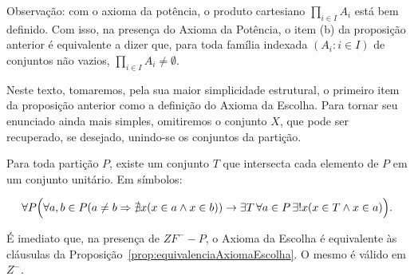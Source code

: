 Observação: com o axioma da potência, o produto cartesiano $\prod_{i\in I} A_i$ está bem definido.
Com isso, na presença do Axioma da Potência, o item (b) da proposição anterior é equivalente a dizer que, para toda família indexada $(A_i: i\in I)$ de conjuntos não vazios, $\prod_{i\in I} A_i \neq \emptyset$.

Neste texto, tomaremos, pela sua maior simplicidade estrutural, o primeiro item da proposição anterior como a definição do Axioma da Escolha.
Para tornar seu enunciado ainda mais simples, omitiremos o conjunto $X$, que pode ser recuperado, se desejado, unindo-se os conjuntos da partição.
\begin{axiom}\label{ax:escolhaParticao}
    Para toda partição $P$, existe um conjunto $T$ que intersecta cada elemento de $P$ em um conjunto unitário.
    Em símbolos:

    \[
    \forall P\Bigl(\forall a, b \in P(a\neq b \Rightarrow \nexists x(x\in a \wedge x\in b)) \rightarrow \exists T\,\forall a\in P\,\exists! x(x\in T \wedge x\in a)\Bigr).
    \]
\end{axiom}

É imediato que, na presença de $ZF^--P$, o Axioma da Escolha é equivalente às cláusulas da Proposição~\ref{prop:equivalenciaAxiomaEscolha}.
O mesmo é válido em $Z^-$.
